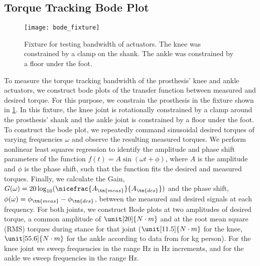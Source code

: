 \subsection{Torque Tracking Bode Plot}
\begin{figure}[htb]
\centerline{\texttt{[image: bode\_fixture]}}
\caption{Fixture for testing bandwidth of actuators. The knee was constrained by
a clamp on the shank. The ankle was constrained by a floor under the
foot.}\label{fig:bode_fixture}
\end{figure}
To measure the torque tracking bandwidth of the prosthesis' knee and ankle
actuators, we construct bode plots of the transfer function between measured and
desired torque. For this purpose, we constrain the prosthesis in the fixture
shown in \cref{fig:bode_fixture}. In this fixture, the knee joint is
rotationally constrained by a clamp around the prosthesis' shank and the ankle
joint is constrained by a floor under the foot. To construct the bode plot, we
repeatedly command sinusoidal desired torques of varying frequencies $\omega$
and observe the resulting measured torques. We perform nonlinear least squares
regression to identify the amplitude and phase shift parameters of the function
$f(t) = A \sin(\omega t + \phi)$, where $A$ is the amplitude and $\phi$ is the
phase shift, such that the function fits the desired and measured torques.
Finally, we calculate the Gain, $G(\omega) = 20 \log_{10}
(\nicefrac{A_\tn{meas}}{A_\tn{des}})$ and the phase shift, $\phi(\omega) =
\phi_\tn{meas} - \phi_\tn{des}$, between the measured and desired signals at
each frequency. For both joints, we construct Bode plots at two amplitudes of
desired torque, a common amplitude of $\unit[20]{N \cdot m}$ and at the root
mean square (RMS) torques during stance for that joint ($\unit[11.5]{N \cdot m}$
for the knee, $\unit[55.6]{N \cdot m}$ for the ankle according to data from
\citet{bovi2011multiple} for \unit[80]{kg} person). For the knee joint we sweep
frequencies in the range \unit[1-35]{Hz} in \unit[1]{Hz} increments, and for the
ankle we sweep frequencies in the range \unit[1-20]{Hz}.

